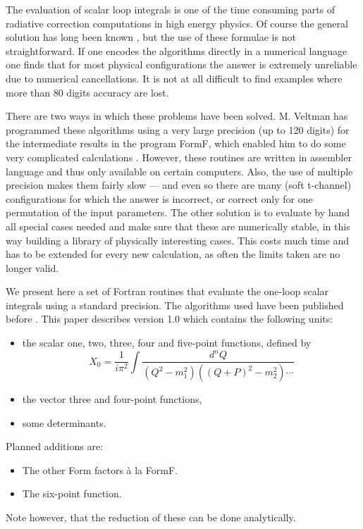 The evaluation of scalar loop integrals is one of the time consuming parts of 
radiative correction computations in high energy physics.  Of course the 
general solution has long been known \cite{tHooft&Veltman}, but the use of 
these formulae is not straightforward.  If one encodes the algorithms directly 
in a numerical language one finds that for most physical configurations the 
answer is extremely unreliable due to numerical cancellations.  It is not at 
all difficult to find examples where more than 80 digits accuracy are lost.

There are two ways in which these problems have been solved.  M. Veltman has 
programmed these algorithms using a very large precision (up to 120 digits) 
for the intermediate results in the program FormF\null, which enabled him to 
do some very complicated calculations \cite{Passarino&Veltman}.  However, 
these routines are written in assembler language and thus only available on 
certain computers.  Also, the use of multiple precision makes them fairly slow 
--- and even so there are many (soft t-channel) configurations for which the 
answer is incorrect, or correct only for one permutation of the input 
parameters.  The other solution is to evaluate by hand all special cases 
needed and make sure that these are numerically stable, in this way building a 
library of physically interesting cases.  This costs much time and has to be 
extended for every new calculation, as often the limits taken are no longer 
valid.

We present here a set of Fortran routines that evaluate the one-loop scalar 
integrals using a standard precision.  The algorithms used have been published 
before \cite{NewAlgorithms}.  This paper describes version 1.0 which contains 
the following units:
\begin{itemize}
\item the scalar one, two, three, four and five-point functions, defined by
\begin{equation}
	X_0 = \frac{1}{i\pi^2} \int \!\!\frac{d^n Q}{(Q^2 - m_1^2)((Q+P)^2 - m_2^2)\cdots}
\end{equation}
\item the vector three and four-point functions,
\item some determinants.
\end{itemize}
Planned additions are:
\begin{itemize}
\item The other Form factors \`{a} la FormF.
\item The six-point function.
\end{itemize}
Note however, that the reduction of these can be done analytically.  

